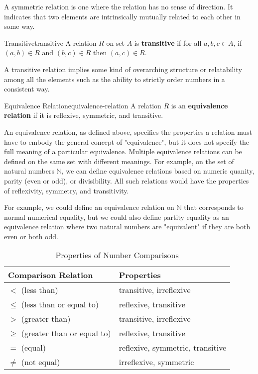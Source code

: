 A symmetric relation is one where the relation has no sense of direction. It indicates that two elements are
intrinsically mutually related to each other in some way.

\begin{definition}{Transitive}{transitive}
  A relation \( R \) on set \( A \) is \textbf{transitive} if for all \( a, b, c \in A \), if \( (a, b) \in R \) and
  \( (b, c) \in R \) then \( (a, c) \in R \).
\end{definition}

A transitive relation implies some kind of overarching structure or relatability among all the elements
such as the ability to strictly order numbers in a consistent way.

\begin{definition}{Equivalence Relation}{equivalence-relation}
  A relation \( R \) is an \textbf{equivalence relation} if it is reflexive, symmetric, and transitive.
\end{definition}

An equivalence relation, as defined above, specifies the properties a relation must have to embody
the general concept of "equivalence", but it does not specify the full meaning of a particular
equivalence. Multiple equivalence relations can be defined on the same set with different meanings.
For example, on the set of natural numbers \( \mathbb{N} \), we can define equivalence relations based
on numeric quanity, parity (even or odd), or divisibility. All such relations would have the properties
of reflexivity, symmetry, and transitivity.

For example, we could define an equivalence relation on \( \mathbb{N} \) that corresponds
to normal numerical equality, but we could also define partity equality as an equivalence relation where two
natural numbers are "equivalent" if they are both even or both odd.

\begin{table}[H]
  \centering
  \begin{tabular}{p{2in} p{3in}}
  \toprule
  \textbf{Comparison Relation} & \textbf{Properties} \\
  \midrule
  \( < \) (less than) & transitive, irreflexive \\
  \( \leq \) (less than or equal to) & reflexive, transitive \\
  \( > \) (greater than) & transitive, irreflexive \\
  \( \geq \) (greater than or equal to) & reflexive, transitive \\
  \( = \) (equal) & reflexive, symmetric, transitive \\
  \( \neq \) (not equal) & irreflexive, symmetric \\
  \bottomrule
  \end{tabular}
  \caption{Properties of Number Comparisons}
\end{table}

